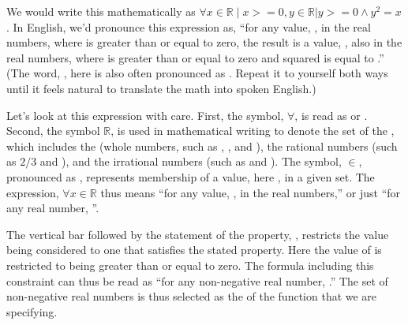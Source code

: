 \documentclass[letterpaper,10pt,english]{sphinxmanual}
\begin{document}
We would write this mathematically as \(\forall x \in {\mathbb R}
\mid x >= 0, y \in {\mathbb R} | y >= 0 \land y^2 = x\). In English,
we’d pronounce this expression as, “for any value, , in the real
numbers, where  is greater than or equal to zero, the result is a
value, , also in the real numbers, where  is greater than or
equal to zero and  squared is equal to .” (The word, ,
here is also often pronounced as . Repeat it to yourself
both ways until it feels natural to translate the math into spoken
English.)

Let’s look at this expression with care. First, the symbol,
\(\forall\), is read as  or . Second, the symbol
\({\mathbb R}\), is used in mathematical writing to denote the set
of the , which includes the  (whole numbers,
such as , , and ), the rational numbers (such as \(2/3\)
and ), and the irrational numbers (such as  and ). The
symbol, \(\in\), pronounced as , represents membership of a
value, here , in a given set. The expression, \(\forall x \in
{\mathbb R}\) thus means “for any value, , in the real numbers,” or
just “for any real number, ”.

The vertical bar followed by the statement of the property, ,
restricts the value being considered to one that satisfies the stated
property. Here the value of  is restricted to being greater than or
equal to zero. The formula including this constraint can thus be read
as “for any non-negative real number, .” The set of non-negative
real numbers is thus selected as the  of the function that we
are specifying.
\end{document}
